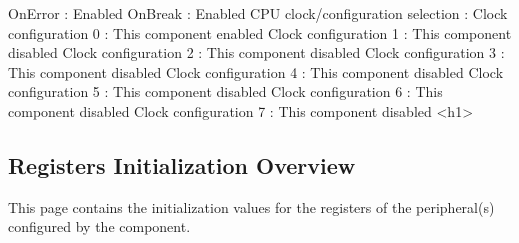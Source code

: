 \begin{DoxyCode}
                OnError                                    : Enabled
                OnBreak                                    : Enabled
            CPU clock/configuration selection              : 
              Clock configuration 0                        : This component enabled
              Clock configuration 1                        : This component disabled
              Clock configuration 2                        : This component disabled
              Clock configuration 3                        : This component disabled
              Clock configuration 4                        : This component disabled
              Clock configuration 5                        : This component disabled
              Clock configuration 6                        : This component disabled
              Clock configuration 7                        : This component disabled
<h1>
\end{DoxyCode}
 \hypertarget{ASerialLdd2_regs_overview}{}\subsection{Registers Initialization Overview}\label{ASerialLdd2_regs_overview}
This page contains the initialization values for the registers of the peripheral(s) configured by the component. \tabulinesep=1mm
